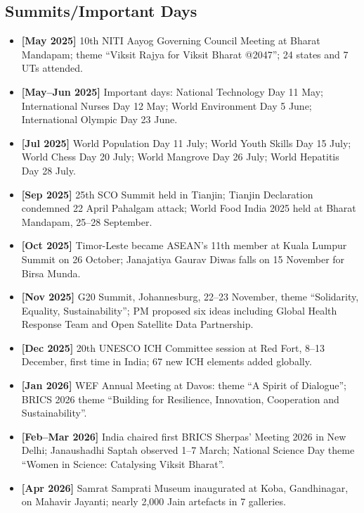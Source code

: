 \documentclass[10pt,a4paper]{article}
\newcommand{\monthtag}[1]{\textbf{[#1]}}
\newcommand{\fact}[2]{\item \monthtag{#1} #2}
\begin{document}
\subsection{Summits/Important Days}
\begin{itemize}
    \fact{May 2025}{10th NITI Aayog Governing Council Meeting at Bharat Mandapam; theme ``Viksit Rajya for Viksit Bharat @2047''; 24 states and 7 UTs attended.}
    \fact{May--Jun 2025}{Important days: National Technology Day 11 May; International Nurses Day 12 May; World Environment Day 5 June; International Olympic Day 23 June.}
    \fact{Jul 2025}{World Population Day 11 July; World Youth Skills Day 15 July; World Chess Day 20 July; World Mangrove Day 26 July; World Hepatitis Day 28 July.}
    \fact{Sep 2025}{25th SCO Summit held in Tianjin; Tianjin Declaration condemned 22 April Pahalgam attack; World Food India 2025 held at Bharat Mandapam, 25--28 September.}
    \fact{Oct 2025}{Timor-Leste became ASEAN's 11th member at Kuala Lumpur Summit on 26 October; Janajatiya Gaurav Diwas falls on 15 November for Birsa Munda.}
    \fact{Nov 2025}{G20 Summit, Johannesburg, 22--23 November, theme ``Solidarity, Equality, Sustainability''; PM proposed six ideas including Global Health Response Team and Open Satellite Data Partnership.}
    \fact{Dec 2025}{20th UNESCO ICH Committee session at Red Fort, 8--13 December, first time in India; 67 new ICH elements added globally.}
    \fact{Jan 2026}{WEF Annual Meeting at Davos: theme ``A Spirit of Dialogue''; BRICS 2026 theme ``Building for Resilience, Innovation, Cooperation and Sustainability''.}
    \fact{Feb--Mar 2026}{India chaired first BRICS Sherpas' Meeting 2026 in New Delhi; Janaushadhi Saptah observed 1--7 March; National Science Day theme ``Women in Science: Catalysing Viksit Bharat''.}
    \fact{Apr 2026}{Samrat Samprati Museum inaugurated at Koba, Gandhinagar, on Mahavir Jayanti; nearly 2,000 Jain artefacts in 7 galleries.}
\end{itemize}
\end{document}

